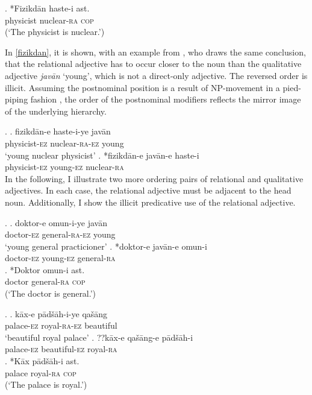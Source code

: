 \documentclass [output=book,colorlinks,citecolor=brown]{langscibook}
\begin{document}
\exg. *Fizikdān haste-i ast.\\
physicist nuclear-\textsc{ra} \textsc{cop}\\
(`The physicist is nuclear.’)

In \ref{fizikdan}, it is shown, with an example from \citet{kahne:2014:revisiting}, who draws the same conclusion, that the relational adjective has to occur closer to the noun than the qualitative adjective \textit{javān} `young’, which is not a direct-only adjective. The reversed order is illicit. Assuming the postnominal position is a result of NP-movement in a pied-piping fashion \citep{ross:1967:constraints, cinque:2010:adj}, the order of the postnominal modifiers reflects the mirror image of the underlying hierarchy. %

\ex. \label{fizikdan} \ag. fizikdān-e haste-i-ye javān\\
physicist-\textsc{ez} nuclear-\textsc{ra-ez} young\\
`young nuclear physicist'
\bg. *fizikdān-e javān-e haste-i\\
physicist-\textsc{ez} young-\textsc{ez} nuclear-\textsc{ra} \hfill \citep[18]{kahne:2014:revisiting}\\

In the following, I illustrate two more ordering pairs of relational and qualitative adjectives. In each case, the relational adjective must be adjacent to the head noun. Additionally, I show the illicit predicative use of the relational adjective.

\ex. \ag. doktor-e omun-i-ye javān\\
doctor-\textsc{ez} general-\textsc{ra-ez} young\\
`young general practicioner'
\bg. *doktor-e javān-e omun-i\\
doctor-\textsc{ez} young-\textsc{ez} general-\textsc{ra}\\
\cg. *Doktor omun-i ast.\\
doctor general-\textsc{ra} \textsc{cop}\\
(`The doctor is general.’)

\ex. \ag. kāx-e pādšāh-i-ye qašāng\\
palace-\textsc{ez} royal-\textsc{ra-ez} beautiful\\
`beautiful royal palace'
\bg. ??kāx-e qašāng-e pādšāh-i\\
palace-\textsc{ez} beautiful-\textsc{ez} royal-\textsc{ra}\\
\cg. *Kāx pādšāh-i ast.\\
palace royal-\textsc{ra} \textsc{cop}\\
(`The palace is royal.’)
\end{document}
